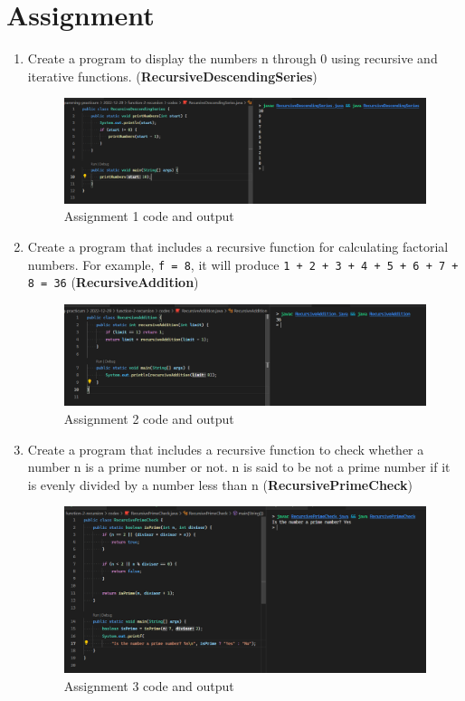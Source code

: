 \documentclass[12pt,titlepage]{article}
\begin{document}
\section{Assignment}
\begin{enumerate}
    \item {
        Create a program to display the numbers n through 0 using recursive and iterative functions. (\textbf{RecursiveDescendingSeries})

        \begin{figure}[h]
            \includegraphics[width=\textwidth]{./images/assignment-one.png}
            \caption{Assignment 1 code and output}
        \end{figure}
    }
    \item {
        Create a program that includes a recursive function for calculating factorial numbers. For example, \texttt{f = 8}, it will produce \texttt{1 + 2 + 3 + 4 + 5 + 6 + 7 + 8 = 36}
        (\textbf{RecursiveAddition})

        \begin{figure}[h]
            \includegraphics[width=\textwidth]{./images/assignment-two.png}
            \caption{Assignment 2 code and output}
        \end{figure}
    }
    \pagebreak
    \item {
        Create a program that includes a recursive function to check whether a number n is a prime number or not. n is said to be not a prime number if it is evenly divided by a number less than n
        (\textbf{RecursivePrimeCheck})

        \begin{figure}[h]
            \includegraphics[width=\textwidth]{./images/assignment-three.png}
            \caption{Assignment 3 code and output}
        \end{figure}
    }
\end{enumerate}
 
\end{document}
